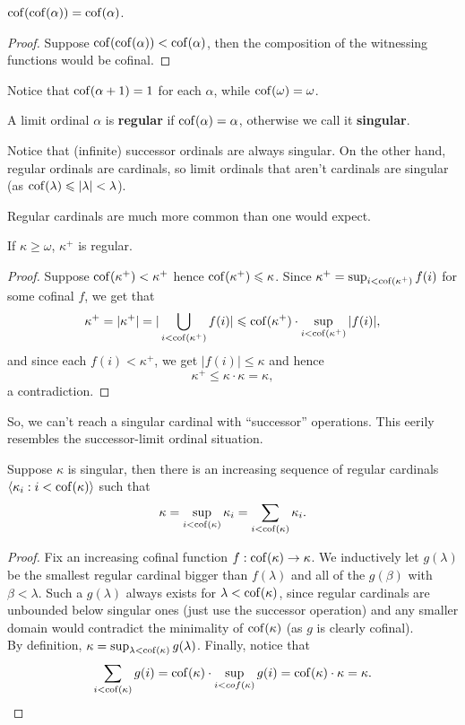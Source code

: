 \documentclass[twoside,openright,titlepage,numbers=noenddot,%
               headinclude,footinclude,cleardoublepage=empty,abstract=on,
               BCOR=23mm,paper=letter,fontsize=11pt
               ]{scrreprt}
\begin{document}
\begin{corollary}
    $\mathrm{cof}(\mathrm{cof}(\alpha)) = \mathrm{cof}(\alpha)$.
\end{corollary}
\begin{proof}
    Suppose $\mathrm{cof}(\mathrm{cof}(\alpha)) < \mathrm{cof}(\alpha)$, then the composition of the witnessing functions would be cofinal.
\end{proof}
\begin{remark}
    Notice that $\mathrm{cof}(\alpha + 1) = 1$ for each $\alpha$, while $\mathrm{cof}(\omega) = \omega$.
\end{remark}
\begin{definition}
    A limit ordinal $\alpha$ is \textbf{regular} if $\mathrm{cof}(\alpha) = \alpha$, otherwise we call it \textbf{singular}.
\end{definition}
\begin{remark}
    Notice that (infinite) successor ordinals are always singular. On the other hand, regular ordinals are cardinals, so limit ordinals that aren't cardinals are singular (as $\mathrm{cof}(\lambda) \leqslant \vert \lambda \vert < \lambda$).
\end{remark}
Regular cardinals are much more common than one would expect.
\begin{theorem}
    If $\kappa \geq \omega$, $\kappa^+$ is regular.
\end{theorem}
\begin{proof}
    Suppose $\mathrm{cof}(\kappa^+) < \kappa^+$ hence $\mathrm{cof}(\kappa^+) \leqslant \kappa$. Since $\kappa^+ = \sup_{i < \mathrm{cof}(\kappa^+)} f(i)$ for some cofinal $f$, we get that
    \[ \kappa^+ = \vert \kappa^+ \vert = \vert \bigcup_{i < \mathrm{cof}(\kappa^+)} f(i) \vert \leqslant \mathrm{cof}(\kappa^+) \cdot \sup_{i < \mathrm{cof}(\kappa^+)} \vert f(i) \vert, \]
    and since each $f(i) < \kappa^+$, we get $\vert f(i) \vert \leq \kappa$ and hence
    \[ \kappa^+ \leq \kappa \cdot \kappa = \kappa, \]
    a contradiction.
\end{proof}
So, we can't reach a singular cardinal with ``successor'' operations. This eerily resembles the successor-limit ordinal situation.
\begin{theorem}
    Suppose $\kappa$ is singular, then there is an increasing sequence of regular cardinals $\langle \kappa_i: i < \mathrm{cof}(\kappa) \rangle$ such that
    \[ \kappa = \sup_{i < \mathrm{cof}(\kappa)} \kappa_i = \sum_{i < \mathrm{cof}(\kappa)} \kappa_i. \]
\end{theorem}
\begin{proof}
    Fix an increasing cofinal function $f: \mathrm{cof}(\kappa) \to \kappa$. We inductively let $g(\lambda)$ be the smallest regular cardinal bigger than $f(\lambda)$ and all of the $g(\beta)$ with $\beta < \lambda$. Such a $g(\lambda)$ always exists for $\lambda < \mathrm{cof}(\kappa)$, since regular cardinals are unbounded below singular ones (just use the successor operation) and any smaller domain would contradict the minimality of $\mathrm{cof}(\kappa)$ (as $g$ is clearly cofinal). \\
    By definition, $\kappa = \sup_{\lambda < \mathrm{cof}(\kappa)} g(\lambda)$. Finally, notice that
    \[ \sum_{i < \mathrm{cof}(\kappa)} g(i) = \mathrm{cof}(\kappa) \cdot \sup_{i < cof(\kappa)} g(i) = \mathrm{cof}(\kappa) \cdot \kappa = \kappa. \] 
\end{proof}
\end{document}
